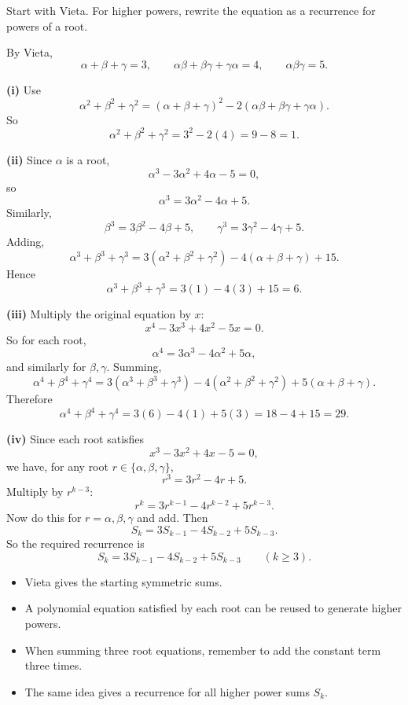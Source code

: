 \begin{hintbox}
Start with Vieta. For higher powers, rewrite the equation as a recurrence for powers of a root.
\end{hintbox}

\begin{solution}
By Vieta,
\[
\alpha+\beta+\gamma=3,\qquad
\alpha\beta+\beta\gamma+\gamma\alpha=4,\qquad
\alpha\beta\gamma=5.
\]

\textbf{(i)} Use
\[
\alpha^2+\beta^2+\gamma^2=(\alpha+\beta+\gamma)^2-2(\alpha\beta+\beta\gamma+\gamma\alpha).
\]
So
\[
\alpha^2+\beta^2+\gamma^2=3^2-2(4)=9-8=\boxed{1.}
\]

\textbf{(ii)} Since $\alpha$ is a root,
\[
\alpha^3-3\alpha^2+4\alpha-5=0,
\]
so
\[
\alpha^3=3\alpha^2-4\alpha+5.
\]
Similarly,
\[
\beta^3=3\beta^2-4\beta+5,\qquad
\gamma^3=3\gamma^2-4\gamma+5.
\]
Adding,
\[
\alpha^3+\beta^3+\gamma^3
=3(\alpha^2+\beta^2+\gamma^2)-4(\alpha+\beta+\gamma)+15.
\]
Hence
\[
\alpha^3+\beta^3+\gamma^3=3(1)-4(3)+15=\boxed{6.}
\]

\textbf{(iii)} Multiply the original equation by $x$:
\[
x^4-3x^3+4x^2-5x=0.
\]
So for each root,
\[
\alpha^4=3\alpha^3-4\alpha^2+5\alpha,
\]
and similarly for $\beta,\gamma$. Summing,
\[
\alpha^4+\beta^4+\gamma^4
=3(\alpha^3+\beta^3+\gamma^3)-4(\alpha^2+\beta^2+\gamma^2)+5(\alpha+\beta+\gamma).
\]
Therefore
\[
\alpha^4+\beta^4+\gamma^4=3(6)-4(1)+5(3)=18-4+15=\boxed{29.}
\]

\textbf{(iv)} Since each root satisfies
\[
x^3-3x^2+4x-5=0,
\]
we have, for any root $r\in\{\alpha,\beta,\gamma\}$,
\[
r^3=3r^2-4r+5.
\]
Multiply by $r^{k-3}$:
\[
r^k=3r^{k-1}-4r^{k-2}+5r^{k-3}.
\]
Now do this for $r=\alpha,\beta,\gamma$ and add. Then
\[
S_k=3S_{k-1}-4S_{k-2}+5S_{k-3}.
\]
So the required recurrence is
\[
\boxed{S_k=3S_{k-1}-4S_{k-2}+5S_{k-3}\qquad (k\ge 3).}
\]
\end{solution}

\begin{takeaways}
\begin{itemize}[leftmargin=*]
\item Vieta gives the starting symmetric sums.
\item A polynomial equation satisfied by each root can be reused to generate higher powers.
\item When summing three root equations, remember to add the constant term three times.
\item The same idea gives a recurrence for all higher power sums $S_k$.
\end{itemize}
\end{takeaways}


